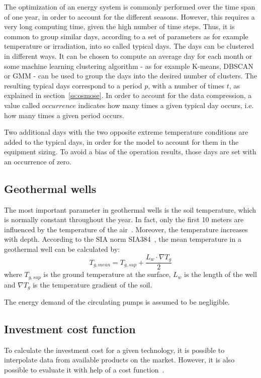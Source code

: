 \documentclass{article}
\begin{document}
The optimization of an energy system is commonly performed over the time span of one year, in order to account for the different seasons. However, this requires a very long computing time, given the high number of time steps. Thus, it is common to group similar days, according to a set of parameters as for example temperature or irradiation, into so called typical days. The days can be clustered in different ways. It can be chosen to compute an average day for each month or some machine learning clustering algorithm - as for example K-means, DBSCAN or GMM - can be used to group the days into the desired number of clusters.
The resulting typical days correspond to a period $p$, with a number of times $t$, as explained in section~\ref{ss:osmose}. In order to account for the data compression, a value called $occurrence$ indicates how many times a given typical day occurs, i.e. how many times a given period occurs.

Two additional days with the two opposite extreme temperature conditions are added to the typical days, in order for the model to account for them in the equipment sizing. To avoid a bias of the operation results, those days are set with an occurrence of zero.


\subsection{Geothermal wells}\label{ss:gtw}

The most important parameter in geothermal wells is the soil temperature, which is normally constant throughout the year. In fact, only the first 10 meters are influenced by the temperature of the air~\cite{hanSensitivityAnalysisVertical2016}. Moreover, the temperature increases with depth. According to the SIA norm SIA384~\cite{siaSIA384Sondes2010}, the mean temperature in a geothermal well can be calculated by:
\begin{equation}
T_{g, mean} = T_{g,sup} + \frac{L_{w} \cdot \nabla T_{g}}{2}
\end{equation}
where $T_{g,sup}$ is the ground temperature at the surface, $L_{w}$ is the length of the well and $ \nabla T_{g}$ is the temperature gradient of the soil. 

The energy demand of the circulating pumps is assumed to be negligible. 

\subsection{Investment cost function}\label{ss:ic}
To calculate the investment cost for a given technology, it is possible to interpolate data from available products on the market. However, it is also possible to evaluate it with help of a cost function~\cite{turtonrichardc.bailierichardwhitingwallace.AnalysisSynthesisDesign2003}.
\end{document}
